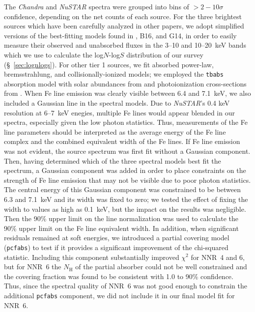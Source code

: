 \documentclass[iop,revtex4]{emulateapj}
\begin{document}
The \textit{Chandra} and \textit{NuSTAR} spectra were grouped into bins of $>2-10\sigma$ confidence, depending on the net counts of each source.  For the three brightest sources which have been carefully analyzed in other papers, we adopt simplified versions of the best-fitting models found in \citet{king14}, B16, and G14, in order to easily measure their observed and unabsorbed fluxes in the 3--10 and 10--20~keV bands which we use to calculate the log$N$-log$S$ distribution of our survey (\S~\ref{sec:lognlogs}).  For other tier 1 sources, we fit absorbed power-law, bremsstrahlung, and collisionally-ionized models; we employed the \texttt{tbabs} absorption model with solar abundances from \citet{wilms00} and photoionization cross-sections from \citet{verner96}. When Fe line emission was clearly visible between 6.4 and 7.1~keV, we also included a Gaussian line in the spectral models.  Due to \textit{NuSTAR}'s 0.4 keV resolution at 6--7~keV enegies, multiple Fe lines would appear blended in our spectra, especially given the low photon statistics.  Thus, measurements of the Fe line parameters should be interpreted as the average energy of the Fe line complex and the combined equivalent width of the Fe lines.  If Fe line emission was not evident, the source spectrum was first fit without a Gaussian component.  Then, having determined which of the three spectral models best fit the spectrum, a Gaussian component was added in order to place constraints on the strength of Fe line emission that may not be visible due to poor photon statistics.  The central energy of this Gaussian component was constrained to be between 6.3 and 7.1~keV and its width was fixed to zero; we tested the effect of fixing the width to values as high as 0.1~keV, but the impact on the results was negligible.  Then the 90\% upper limit on the line normalization was used to calculate the 90\% upper limit on the Fe line equivalent width.  In addition, when significant residuals remained at soft energies, we introduced a partial covering model (\texttt{pcfabs}) to test if it provides a significant improvement of the chi-squared statistic.  Including this component substantially improved $\chi^2$ for NNR~4 and 6, but for NNR~6 the $N_{\mathrm{H}}$ of the partial absorber could not be well constrained and the covering fraction was found to be consistent with 1.0 to 90\% confidence.  Thus, since the spectral quality of NNR~6 was not good enough to constrain the additional \texttt{pcfabs} component, we did not include it in our final model fit for NNR~6.  \par 
\end{document}
